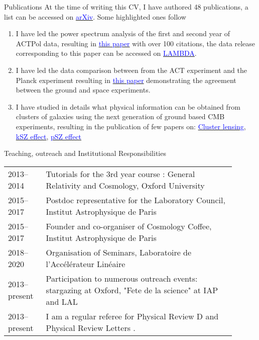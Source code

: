 \documentclass{resume} %
\newcommand{\TIB}[1]{\textcolor{blue}{#1}}
\begin{document}
\begin{rSection}{Publications}
At the time of writing this CV, I have authored 48 publications, a list can be accessed on \href{https://arxiv.org/search/astro-ph?searchtype=author&query=Louis\%2C+T}{\TIB{arXiv}}. Some highlighted ones follow
\begin{enumerate}
\item I have led the power spectrum analysis of the first and second year of ACTPol data, resulting in \href{https://ui.adsabs.harvard.edu/abs/2017JCAP...06..031L}{\TIB{this paper}} with over 100 citations, the data release corresponding to this paper can be accessed on \href{https://lambda.gsfc.nasa.gov/product/act/actpol_prod_table.cfm}{\TIB{LAMBDA}}.
\item I have led the data comparison between from the ACT experiment and the Planck experiment resulting in \href{https://ui.adsabs.harvard.edu/abs/2014JCAP...07..016L}{\TIB{this paper}} demonstrating the agreement between the ground and space experiments.
\item I have studied in details what physical information can be obtained from clusters of galaxies using the next generation of ground based CMB experiments, resulting in the publication of few papers on: \href{https://ui.adsabs.harvard.edu/abs/2017PhRvD..95d3517L}{ \TIB{Cluster lensing}},  \href{https://ui.adsabs.harvard.edu/abs/2016PhRvD..94d3522A}{ \TIB{kSZ effect}}, \href{https://journals.aps.org/prd/abstract/10.1103/PhysRevD.96.123509}{\TIB{pSZ effect}}

\end{enumerate}



\end{rSection}

\vspace{2cm}


\begin{rSection}{Teaching, outreach and Institutional Responsibilities}
\vspace{-0.4cm}
\begin{table}[h]
{\def\arraystretch{1.5}\tabcolsep=0pt
\begin{tabular}{p{0.15\linewidth}p{0.75\linewidth}}
2013--2014 &  Tutorials for the 3rd year course : General Relativity and Cosmology, Oxford University \\
2015--2017 &  Postdoc representative for the Laboratory Council, Institut Astrophysique de Paris \\
2015--2017 &  Founder and co-organiser of Cosmology Coffee, Institut Astrophysique de Paris  \\
2018--2020 &  Organisation of Seminars, Laboratoire de l'Accélérateur Linéaire  \\
2013--present & Participation to numerous outreach events: stargazing at Oxford, "Fete de la science" at IAP and LAL \\
2013--present &  I am a regular referee for Physical Review D and Physical Review Letters .  
\end{tabular}%
}
\end{table}
\vspace{-0.6cm}
\end{rSection}
\end{document}
